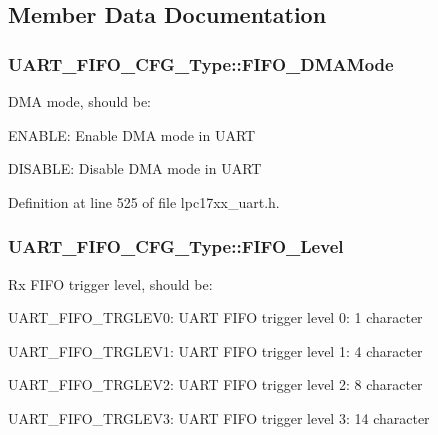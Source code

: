 \subsection{\-Member \-Data \-Documentation}
\hypertarget{struct_u_a_r_t___f_i_f_o___c_f_g___type_ac2290ece03c3cf70067e1043cb6dad9e}{
\subsubsection[{\-F\-I\-F\-O\-\_\-\-D\-M\-A\-Mode}]{ {\bf \-U\-A\-R\-T\-\_\-\-F\-I\-F\-O\-\_\-\-C\-F\-G\-\_\-\-Type\-::\-F\-I\-F\-O\-\_\-\-D\-M\-A\-Mode}}}\label{struct_u_a_r_t___f_i_f_o___c_f_g___type_ac2290ece03c3cf70067e1043cb6dad9e}
\-D\-M\-A mode, should be\-:
\begin{DoxyItemize}
\item \-E\-N\-A\-B\-L\-E\-: \-Enable \-D\-M\-A mode in \-U\-A\-R\-T
\item \-D\-I\-S\-A\-B\-L\-E\-: \-Disable \-D\-M\-A mode in \-U\-A\-R\-T 
\end{DoxyItemize}

\-Definition at line 525 of file lpc17xx\-\_\-uart.\-h.

\hypertarget{struct_u_a_r_t___f_i_f_o___c_f_g___type_afe71db9c3088c092ae6a93ddba4e967d}{
\subsubsection[{\-F\-I\-F\-O\-\_\-\-Level}]{ {\bf \-U\-A\-R\-T\-\_\-\-F\-I\-F\-O\-\_\-\-C\-F\-G\-\_\-\-Type\-::\-F\-I\-F\-O\-\_\-\-Level}}}\label{struct_u_a_r_t___f_i_f_o___c_f_g___type_afe71db9c3088c092ae6a93ddba4e967d}
\-Rx \-F\-I\-F\-O trigger level, should be\-:
\begin{DoxyItemize}
\item \-U\-A\-R\-T\-\_\-\-F\-I\-F\-O\-\_\-\-T\-R\-G\-L\-E\-V0\-: \-U\-A\-R\-T \-F\-I\-F\-O trigger level 0\-: 1 character
\item \-U\-A\-R\-T\-\_\-\-F\-I\-F\-O\-\_\-\-T\-R\-G\-L\-E\-V1\-: \-U\-A\-R\-T \-F\-I\-F\-O trigger level 1\-: 4 character
\item \-U\-A\-R\-T\-\_\-\-F\-I\-F\-O\-\_\-\-T\-R\-G\-L\-E\-V2\-: \-U\-A\-R\-T \-F\-I\-F\-O trigger level 2\-: 8 character
\item \-U\-A\-R\-T\-\_\-\-F\-I\-F\-O\-\_\-\-T\-R\-G\-L\-E\-V3\-: \-U\-A\-R\-T \-F\-I\-F\-O trigger level 3\-: 14 character 
\end{DoxyItemize}

